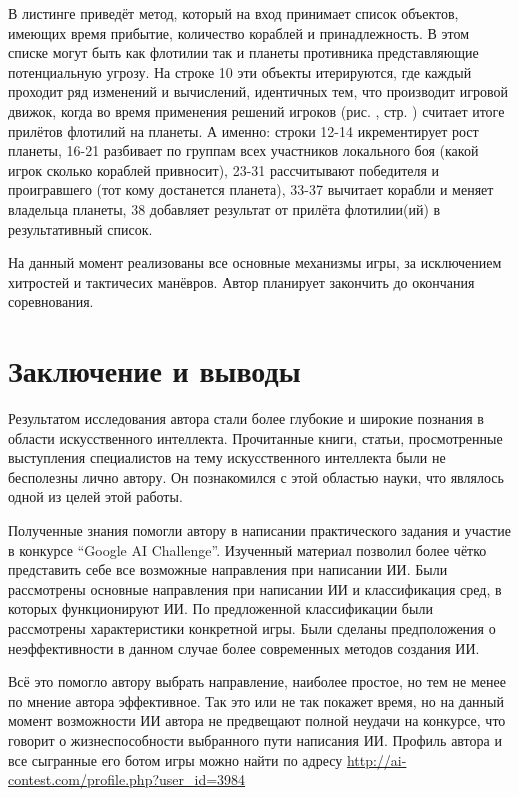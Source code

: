 \documentclass[12pt]{report}
\begin{document}
В листинге приведёт метод, который на вход принимает список объектов, имеющих время прибытие, количество кораблей и принадлежность. В этом списке могут быть как флотилии так и планеты противника представляющие потенциальную угрозу. На строке 10 эти объекты итерируются, где каждый проходит ряд изменений и вычислений, идентичных тем, что производит игровой движок, когда во время применения решений игроков (рис. , стр. ) считает итоге прилётов флотилий на планеты. А именно: строки 12-14 икрементирует рост планеты, 16-21 разбивает по группам всех участников локального боя (какой игрок сколько кораблей привносит), 23-31 рассчитывают победителя и проигравшего (тот кому достанется планета), 33-37 вычитает корабли и меняет владельца планеты, 38 добавляет результат от прилёта флотилии(ий) в результативный список.

На данный момент реализованы все основные механизмы игры, за исключением хитростей и тактичесих манёвров. Автор планирует закончить до окончания соревнования.

\chapter*{Заключение и выводы}
\thispagestyle{fancy}
Результатом исследования автора стали более глубокие и широкие познания в области искусственного интеллекта. Прочитанные книги, статьи, просмотренные выступления специалистов на тему искусственного интеллекта были не бесполезны лично автору. Он познакомился с этой областью науки, что являлось одной из целей этой работы.

Полученные знания помогли автору в написании практического задания и участие в конкурсе ``Google AI Challenge''. Изученный материал позволил более чётко представить себе все возможные направления при написании ИИ. Были рассмотрены основные направления при написании ИИ и классификация сред, в которых функционируют ИИ. По предложенной классификации были рассмотрены характеристики конкретной игры. Были сделаны предположения о неэффективности в данном случае более современных методов создания ИИ.

Всё это помогло автору выбрать направление, наиболее простое, но тем не менее по мнение автора эффективное. Так это или не так покажет время, но на данный момент возможности ИИ автора не предвещают полной неудачи на конкурсе, что говорит о жизнеспособности выбранного пути написания ИИ. Профиль автора и все сыгранные его ботом игры можно найти по адресу \url{http://ai-contest.com/profile.php?user\_id=3984}
\end{document}
